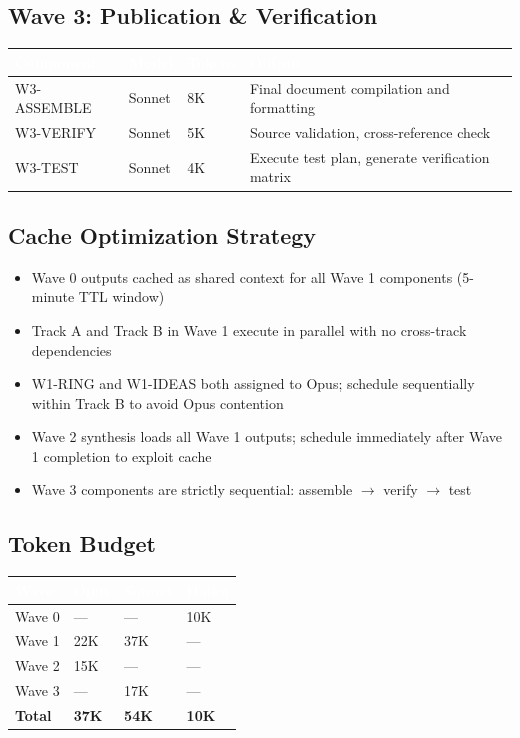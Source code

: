\documentclass[11pt,letterpaper]{article}
\newcommand{\tableheader}[1]{\textbf{\sffamily\textcolor{white}{#1}}}
\begin{document}
\subsection{Wave 3: Publication \& Verification}

\begin{center}
\begin{tabularx}{\textwidth}{L{2.5cm}C{1.5cm}C{1.5cm}X}
\toprule
{}
\tableheader{Component} & \tableheader{Model} & \tableheader{Tokens} & \tableheader{Output} \\
\midrule
W3-ASSEMBLE & Sonnet & 8K & Final document compilation and formatting \\
W3-VERIFY & Sonnet & 5K & Source validation, cross-reference check \\
W3-TEST & Sonnet & 4K & Execute test plan, generate verification matrix \\
\bottomrule
\end{tabularx}
\end{center}

\subsection{Cache Optimization Strategy}

\begin{itemize}[leftmargin=2em]
\item Wave 0 outputs cached as shared context for all Wave 1 components (5-minute TTL window)
\item Track A and Track B in Wave 1 execute in parallel with no cross-track dependencies
\item W1-RING and W1-IDEAS both assigned to Opus; schedule sequentially within Track B to avoid Opus contention
\item Wave 2 synthesis loads all Wave 1 outputs; schedule immediately after Wave 1 completion to exploit cache
\item Wave 3 components are strictly sequential: assemble $\rightarrow$ verify $\rightarrow$ test
\end{itemize}

\subsection{Token Budget}

\begin{center}
\begin{tabularx}{\textwidth}{L{3cm}C{2cm}C{2cm}C{2cm}}
\toprule
{}
\tableheader{Wave} & \tableheader{Opus} & \tableheader{Sonnet} & \tableheader{Haiku} \\
\midrule
Wave 0 & --- & --- & 10K \\
Wave 1 & 22K & 37K & --- \\
Wave 2 & 15K & --- & --- \\
Wave 3 & --- & 17K & --- \\
\midrule
\textbf{Total} & \textbf{37K} & \textbf{54K} & \textbf{10K} \\
\bottomrule
\end{tabularx}
\end{center}
\end{document}
